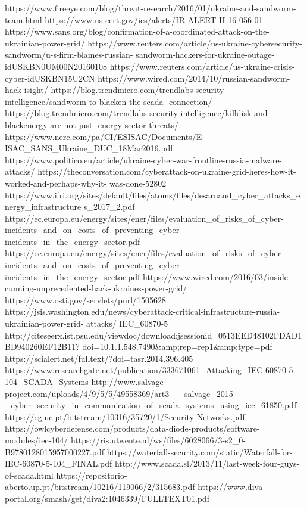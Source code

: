 https://www.fireeye.com/blog/threat-research/2016/01/ukraine-and-sandworm-team.html
https://www.us-cert.gov/ics/alerts/IR-ALERT-H-16-056-01
https://www.sans.org/blog/confirmation-of-a-coordinated-attack-on-the-ukrainian-power-grid/
https://www.reuters.com/article/us-ukraine-cybersecurity-sandworm/u-s-firm-blames-russian-
sandworm-hackers-for-ukraine-outage-idUSKBN0UM00N20160108
https://www.reuters.com/article/us-ukraine-crisis-cyber-idUSKBN15U2CN
https://www.wired.com/2014/10/russian-sandworm-hack-isight/
https://blog.trendmicro.com/trendlabs-security-intelligence/sandworm-to-blacken-the-scada-
connection/
https://blog.trendmicro.com/trendlabs-security-intelligence/killdisk-and-blackenergy-are-not-just-
energy-sector-threats/
https://www.nerc.com/pa/CI/ESISAC/Documents/E-ISAC_SANS_Ukraine_DUC_18Mar2016.pdf
https://www.politico.eu/article/ukraine-cyber-war-frontline-russia-malware-attacks/
https://theconversation.com/cyberattack-on-ukraine-grid-heres-how-it-worked-and-perhaps-why-it-
was-done-52802
https://www.ifri.org/sites/default/files/atoms/files/desarnaud_cyber_attacks_energy_infrastructure
s_2017_2.pdf
https://ec.europa.eu/energy/sites/ener/files/evaluation_of_risks_of_cyber-
incidents_and_on_costs_of_preventing_cyber-incidents_in_the_energy_sector.pdf
https://ec.europa.eu/energy/sites/ener/files/evaluation_of_risks_of_cyber-
incidents_and_on_costs_of_preventing_cyber-incidents_in_the_energy_sector.pdf
https://www.wired.com/2016/03/inside-cunning-unprecedented-hack-ukraines-power-grid/
https://www.osti.gov/servlets/purl/1505628
https://jsis.washington.edu/news/cyberattack-critical-infrastructure-russia-ukrainian-power-grid-
attacks/
IEC_60870-5
http://citeseerx.ist.psu.edu/viewdoc/download;jsessionid=0513EED48102FDAD1BD940260EF12B11?
doi=10.1.1.548.7490&amp;rep=rep1&amp;type=pdf
https://scialert.net/fulltext/?doi=tasr.2014.396.405
https://www.researchgate.net/publication/333671061_Attacking_IEC-60870-5-104_SCADA_Systems
http://www.salvage-project.com/uploads/4/9/5/5/49558369/art3_-_salvage_2015_-
_cyber_security_in_communication_of_scada_systems_using_iec_61850.pdf
https://eg.uc.pt/bitstream/10316/35720/1/Security%
Networks.pdf
https://owlcyberdefense.com/products/data-diode-products/software-modules/iec-104/
https://ris.utwente.nl/ws/files/6028066/3-s2_0-B9780128015957000227.pdf
https://waterfall-security.com/static/Waterfall-for-IEC-60870-5-104_FINAL.pdf
http://www.scada.sl/2013/11/last-week-four-guys-of-scada.html
https://repositorio-aberto.up.pt/bitstream/10216/119066/2/315683.pdf
https://www.diva-portal.org/smash/get/diva2:1046339/FULLTEXT01.pdf
